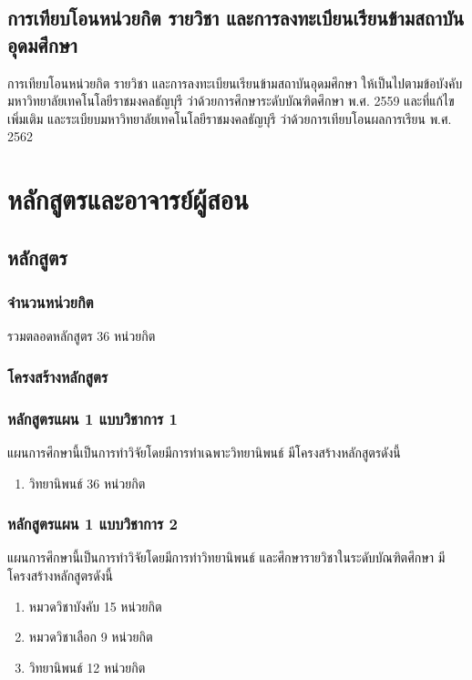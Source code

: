 \subsection{การเทียบโอนหน่วยกิต รายวิชา และการลงทะเบียนเรียนข้ามสถาบันอุดมศึกษา}
การเทียบโอนหน่วยกิต รายวิชา และการลงทะเบียนเรียนข้ามสถาบันอุดมศึกษา ให้เป็นไปตามข้อบังคับมหาวิทยาลัยเทคโนโลยีราชมงคลธัญบุรี ว่าด้วยการศึกษาระดับบัณฑิตศึกษา พ.ศ. 2559 และที่แก้ไขเพิ่มเติม และระเบียบมหาวิทยาลัยเทคโนโลยีราชมงคลธัญบุรี ว่าด้วยการเทียบโอนผลการเรียน พ.ศ. 2562

\section{หลักสูตรและอาจารย์ผู้สอน}
\subsection{หลักสูตร}

\subsubsection{จำนวนหน่วยกิต}	
รวมตลอดหลักสูตร 36 หน่วยกิต

\subsubsection{โครงสร้างหลักสูตร}
 
\subsubsection*{หลักสูตรแผน 1 แบบวิชาการ 1} 
แผนการศึกษานี้เป็นการทำวิจัยโดยมีการทำเฉพาะวิทยานิพนธ์ มีโครงสร้างหลักสูตรดังนี้

\begin{enumerate}
	\item วิทยานิพนธ์ \hfill 36 หน่วยกิต
\end{enumerate}

\subsubsection*{หลักสูตรแผน 1 แบบวิชาการ 2} 
แผนการศึกษานี้เป็นการทำวิจัยโดยมีการทำวิทยานิพนธ์ และศึกษารายวิชาในระดับบัณฑิตศึกษา มีโครงสร้างหลักสูตรดังนี้

\begin{enumerate}
	\item หมวดวิชาบังคับ \hfill 15 หน่วยกิต
	\item หมวดวิชาเลือก \hfill 9 หน่วยกิต
	\item วิทยานิพนธ์ \hfill 12 หน่วยกิต
\end{enumerate}


